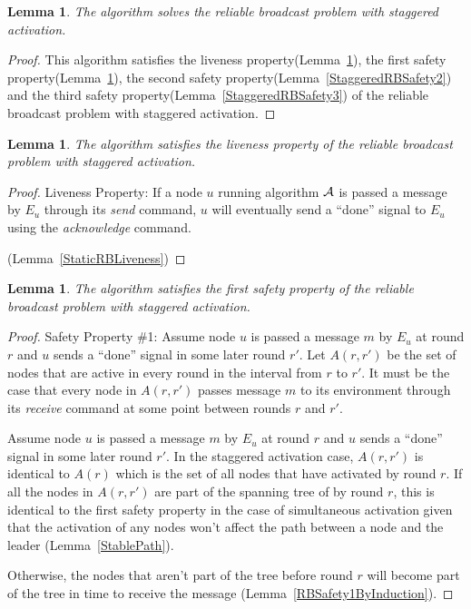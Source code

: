 \documentclass[english]{article}
\newtheorem{lemma}[theorem]{Lemma}
\begin{document}
\begin{lemma}
\label{StaggeredReliableBroadcast}
The algorithm solves the reliable broadcast problem with staggered activation.
\end{lemma}
\begin{proof}
This algorithm satisfies the liveness property(Lemma~\ref{StaggeredRBLiveness}), 
the first safety property(Lemma~\ref{StaggeredRBSafety1}),
the second safety property(Lemma~\ref{StaggeredRBSafety2}) and 
the third safety property(Lemma~\ref{StaggeredRBSafety3}) of the reliable broadcast problem with staggered activation.
\end{proof}

\begin{lemma}
\label{StaggeredRBLiveness}
The algorithm satisfies the liveness property of the reliable broadcast problem with staggered activation.
\end{lemma}
\begin{proof}
Liveness Property: If a node $u$ running algorithm $\cal A$ is passed a message by $E_u$ through its \textit{send} command, $u$ will eventually send  a ``done'' signal to $E_u$ using the \textit{acknowledge} command.

(Lemma~\ref{StaticRBLiveness})
\end{proof}


\begin{lemma}
\label{StaggeredRBSafety1}
The algorithm satisfies the first safety property of the reliable broadcast problem with staggered activation.
\end{lemma}
\begin{proof}
Safety Property \#1: Assume node $u$ is passed a message $m$ by $E_u$ at round $r$ and $u$ sends  a ``done'' signal in some later round $r'$. Let $A(r,r')$ be the set of nodes that are active in every round in the interval from $r$ to $r'$. It must be the case that every node in $A(r,r')$ passes message $m$ to its environment through its \textit{receive} command at some point between rounds $r$ and $r'$. 

Assume node $u$ is passed a message $m$ by $E_u$ at round $r$ and $u$ sends  a ``done'' signal in some later round $r'$.
In the staggered activation case, $A(r,r')$ is identical to $A(r)$ which is the set of all nodes that have activated by round $r$. If all the nodes in $A(r,r')$ are part of the spanning tree of by round $r$, this is identical to the first safety property in the case of simultaneous activation given that the activation of any nodes won't affect the path between a node and the leader (Lemma~\ref{StablePath}). 

Otherwise, the nodes that aren't part of the tree before round $r$ will become part of the tree in time to receive the message (Lemma~\ref{RBSafety1ByInduction}). 

\end{proof}
\end{document}
